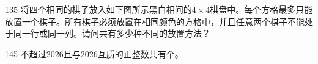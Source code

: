 \Needspace{6.5cm}
\begin{question}{13}{5}
将四个相同的棋子放入如下图所示黑白相间的\(4\times4\)棋盘中。每个方格最多只能放置一个棋子。所有棋子必须放置在相同颜色的方格中，并且任意两个棋子不能处于同一行或同一列。请问共有多少种不同的放置方法？\answerline

\begin{center}
\end{center}
\end{question}

\begin{question}{14}{5}
不超过2026且与2026互质的正整数共有\answerline 个。
\end{question}

